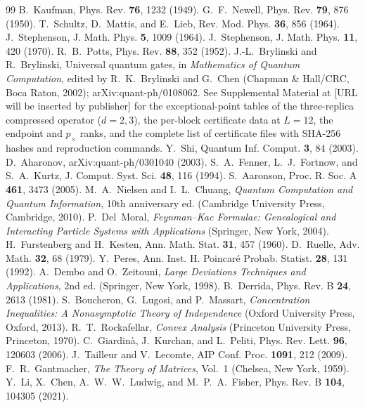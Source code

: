 \documentclass[aps,prx,reprint,superscriptaddress,nobibnotes,longbibliography]{revtex4-2}
\theoremstyle{remark}
\begin{document}
\begin{thebibliography}{99}
 B.~Kaufman, Phys. Rev. \textbf{76}, 1232 (1949).
 G.~F.~Newell, Phys. Rev. \textbf{79}, 876 (1950).
 T.~Schultz, D.~Mattis, and E.~Lieb, Rev. Mod. Phys. \textbf{36}, 856 (1964).
 J.~Stephenson, J. Math. Phys. \textbf{5}, 1009 (1964).
 J.~Stephenson, J. Math. Phys. \textbf{11}, 420 (1970).
 R.~B.~Potts, Phys. Rev. \textbf{88}, 352 (1952).
 J.-L.~Brylinski and R.~Brylinski, Universal quantum gates, in \emph{Mathematics of Quantum Computation}, edited by R.~K.~Brylinski and G.~Chen (Chapman \& Hall/CRC, Boca Raton, 2002); arXiv:quant-ph/0108062.
 See Supplemental Material at [URL will be inserted by publisher] for the exceptional-point tables of the three-replica compressed operator ($d=2,3$), the per-block certificate data at $L=12$, the endpoint and $p_\times$ ranks, and the complete list of certificate files with SHA-256 hashes and reproduction commands.
 Y.~Shi, Quantum Inf. Comput. \textbf{3}, 84 (2003).
 D.~Aharonov, arXiv:quant-ph/0301040 (2003).
 S.~A.~Fenner, L.~J.~Fortnow, and S.~A.~Kurtz, J. Comput. Syst. Sci. \textbf{48}, 116 (1994).
 S.~Aaronson, Proc. R. Soc. A \textbf{461}, 3473 (2005).
 M.~A.~Nielsen and I.~L.~Chuang, \emph{Quantum Computation and Quantum Information}, 10th anniversary ed. (Cambridge University Press, Cambridge, 2010).
 P.~Del~Moral, \emph{Feynman--Kac Formulae: Genealogical and Interacting Particle Systems with Applications} (Springer, New York, 2004).
 H.~Furstenberg and H.~Kesten, Ann. Math. Stat. \textbf{31}, 457 (1960).
 D.~Ruelle, Adv. Math. \textbf{32}, 68 (1979).
 Y.~Peres, Ann. Inst. H. Poincar\'e Probab. Statist. \textbf{28}, 131 (1992).
 A.~Dembo and O.~Zeitouni, \emph{Large Deviations Techniques and Applications}, 2nd ed. (Springer, New York, 1998).
 B.~Derrida, Phys. Rev. B \textbf{24}, 2613 (1981).
 S.~Boucheron, G.~Lugosi, and P.~Massart, \emph{Concentration Inequalities: A Nonasymptotic Theory of Independence} (Oxford University Press, Oxford, 2013).
 R.~T.~Rockafellar, \emph{Convex Analysis} (Princeton University Press, Princeton, 1970).
 C.~Giardin\`a, J.~Kurchan, and L.~Peliti, Phys. Rev. Lett. \textbf{96}, 120603 (2006).
 J.~Tailleur and V.~Lecomte, AIP Conf. Proc. \textbf{1091}, 212 (2009).
 F.~R.~Gantmacher, \emph{The Theory of Matrices}, Vol.~1 (Chelsea, New York, 1959).
 Y.~Li, X.~Chen, A.~W.~W.~Ludwig, and M.~P.~A.~Fisher, Phys. Rev. B \textbf{104}, 104305 (2021).
\end{thebibliography}
\end{document}
